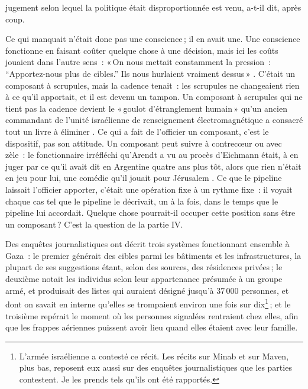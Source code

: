jugement selon lequel la politique était disproportionnée est venu, a-t-il dit, après coup.

Ce qui manquait n'était donc pas une conscience\,; il en avait une. Une conscience fonctionne en faisant coûter quelque chose à une décision, mais ici les coûts jouaient dans l'autre sens~: «\,On nous mettait constamment la pression~: “Apportez-nous plus de cibles.” Ils nous hurlaient vraiment dessus\,» \autocite{abraham2024lavender}. C'était un composant à scrupules, mais la cadence tenait~: les scrupules ne changeaient rien à ce qu'il apportait, et il est devenu un tampon. Un composant à scrupules qui ne tient pas la cadence devient le «\,goulot d'étranglement humain\,» qu'un ancien commandant de l'unité israélienne de renseignement électromagnétique a consacré tout un livre à éliminer \autocite{ys2021humanmachine}. Ce qui a fait de l'officier un composant, c'est le dispositif, pas son attitude. Un composant peut suivre à contrecœur ou avec zèle~: le fonctionnaire irréfléchi qu'Arendt a vu au procès d'Eichmann \autocite{arendt1963eichmann} était, à en juger par ce qu'il avait dit en Argentine quatre ans plus tôt, alors que rien n'était en jeu pour lui, une comédie qu'il jouait pour Jérusalem \autocite{stangneth2014eichmann}. Ce que le pipeline laissait l'officier apporter, c'était une opération fixe à un rythme fixe~: il voyait chaque cas tel que le pipeline le décrivait, un à la fois, dans le temps que le pipeline lui accordait. Quelque chose pourrait-il occuper cette position sans être un composant\,? C'est la question de la partie IV.

Des enquêtes journalistiques ont décrit trois systèmes fonctionnant ensemble à Gaza~: le premier générait des cibles parmi les bâtiments et les infrastructures, la plupart de ses suggestions étant, selon des sources, des résidences privées\,; le deuxième notait les individus selon leur appartenance présumée à un groupe armé, et produisait des listes qui auraient désigné jusqu'à 37\,000 personnes, et dont on savait en interne qu'elles se trompaient environ une fois sur dix\footnote{L'armée israélienne a contesté ce récit. Les récits sur Minab et sur Maven, plus bas, reposent eux aussi sur des enquêtes journalistiques que les parties contestent. Je les prends tels qu'ils ont été rapportés.}\,; et le troisième repérait le moment où les personnes signalées rentraient chez elles, afin que les frappes aériennes puissent avoir lieu quand elles étaient avec leur famille.


